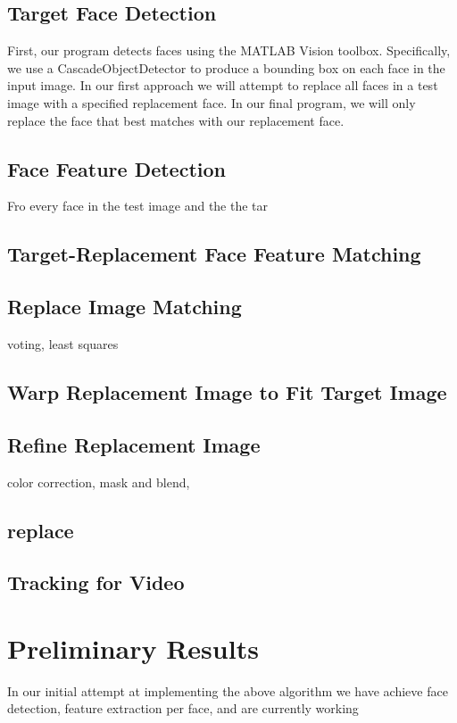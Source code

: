 \documentclass{article}
\begin{document}
\subsection{Target Face Detection}
First, our program detects faces using the MATLAB Vision toolbox. Specifically, we use a CascadeObjectDetector to produce a bounding box on each face in the input image. In our first approach we will attempt to replace all faces in a test image with a specified replacement face. In our final program, we will only replace the face that best matches with our replacement face. 

\subsection{Face Feature Detection}
Fro every face in the test image and the the tar

\subsection{Target-Replacement Face Feature Matching}

\subsection{Replace Image Matching}
voting, least squares
\subsection{Warp Replacement Image to Fit Target Image}
\subsection{Refine Replacement Image}
color correction, mask and blend, 
\subsection{replace}
\subsection{Tracking for Video}


\section{Preliminary Results} 
In our initial attempt at implementing the above algorithm we have achieve face detection, feature extraction per face, and are currently working
\end{document}
